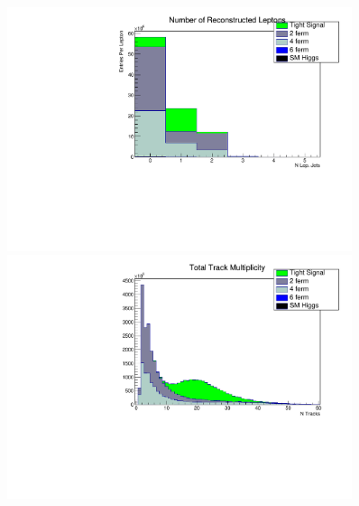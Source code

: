 
\begin{figure}
	
 \centering
    \begin{minipage}{0.49\textwidth}
   
        \centering
        \includegraphics[width=0.9\textwidth]{nLepHist.pdf} %
     
    \end{minipage}\hfill
    \begin{minipage}{0.49\textwidth}
        \centering
        \includegraphics[width=0.9\textwidth]{ntracksHist.pdf} %
       
     \end{minipage}\\


\end{figure}
